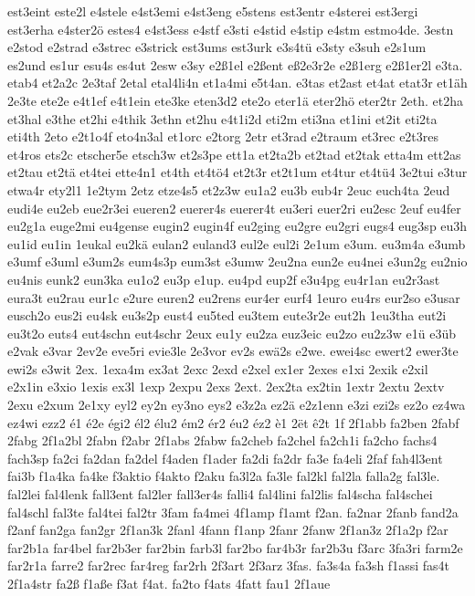 {est3eint
este2l
e4stele
e4st3emi
e4st3eng
e5stens
est3entr
e4sterei
est3ergi
est3erha
e4ster2ö
estes4
e4st3ess
e4stf
e3sti
e4stid
e4stip
e4stm
estmo4de.
3estn
e2stod
e2strad
e3strec
e3strick
est3ums
est3urk
e3s4tü
e3sty
e3suh
e2s1um
es2und
es1ur
esu4s
es4ut
2esw
e3sy
e2ß1el
e2ßent
eß2e3r2e
e2ß1erg
e2ß1er2l
e3ta.
etab4
et2a2c
2e3taf
2etal
etal4li4n
et1a4mi
e5t4an.
e3tas
et2ast
et4at
etat3r
et1äh
2e3te
ete2e
e4t1ef
e4t1ein
ete3ke
eten3d2
ete2o
eter1ä
eter2hö
eter2tr
2eth.
et2ha
et3hal
e3the
et2hi
e4thik
3ethn
et2hu
e4t1i2d
eti2m
eti3na
et1ini
et2it
eti2ta
eti4th
2eto
e2t1o4f
eto4n3al
et1orc
e2torg
2etr
et3rad
e2traum
et3rec
e2t3res
et4ros
ets2c
etscher5e
etsch3w
et2s3pe
ett1a
et2ta2b
et2tad
et2tak
etta4m
ett2as
et2tau
et2tä
et4tei
ette4n1
et4th
et4tö4
et2t3r
et2t1um
et4tur
et4tü4
3e2tui
e3tur
etwa4r
ety2l1
1e2tym
2etz
etze4s5
et2z3w
eu1a2
eu3b
eub4r
2euc
euch4ta
2eud
eudi4e
eu2eb
eue2r3ei
eueren2
euerer4s
euerer4t
eu3eri
euer2ri
eu2esc
2euf
eu4fer
eu2g1a
euge2mi
eu4gense
eugin2
eugin4f
eu2ging
eu2gre
eu2gri
eugs4
eug3sp
eu3h
eu1id
eu1in
1eukal
eu2kä
eulan2
euland3
eul2e
eul2i
2e1um
e3um.
eu3m4a
e3umb
e3umf
e3uml
e3um2s
eum4s3p
eum3st
e3umw
2eu2na
eun2e
eu4nei
e3un2g
eu2nio
eu4nis
eunk2
eun3ka
eu1o2
eu3p
e1up.
eu4pd
eup2f
e3u4pg
eu4r1an
eu2r3ast
eura3t
eu2rau
eur1c
e2ure
euren2
eu2rens
eur4er
eurf4
1euro
eu4rs
eur2so
e3usar
eusch2o
eus2i
eu4sk
eu3s2p
eust4
eu5ted
eu3tem
eute3r2e
eut2h
1eu3tha
eut2i
eu3t2o
euts4
eut4schn
eut4schr
2eux
eu1y
eu2za
euz3eic
eu2zo
eu2z3w
e1ü
e3üb
e2vak
e3var
2ev2e
eve5ri
evie3le
2e3vor
ev2s
ewä2s
e2we.
ewei4sc
ewert2
ewer3te
ewi2s
e3wit
2ex.
1exa4m
ex3at
2exc
2exd
e2xel
ex1er
2exes
e1xi
2exik
e2xil
e2x1in
e3xio
1exis
ex3l
1exp
2expu
2exs
2ext.
2ex2ta
ex2tin
1extr
2extu
2extv
2exu
e2xum
2e1xy
eyl2
ey2n
ey3no
eys2
e3z2a
ez2ä
e2z1enn
e3zi
ezi2s
ez2o
ez4wa
ez4wi
ezz2
é1
é2e
égi2
él2
élu2
ém2
ér2
éu2
éz2
è1
2ët
ê2t
1f
2f1abb
fa2ben
2fabf
2fabg
2f1a2bl
2fabn
f2abr
2f1abs
2fabw
fa2cheb
fa2chel
fa2ch1i
fa2cho
fachs4
fach3sp
fa2ci
fa2dan
fa2del
f4aden
f1ader
fa2di
fa2dr
fa3e
fa4eli
2faf
fah4l3ent
fai3b
f1a4ka
fa4ke
f3aktio
f4akto
f2aku
fa3l2a
fa3le
fal2kl
fal2la
falla2g
fal3le.
fal2lei
fal4lenk
fall3ent
fal2ler
fall3er4s
falli4
fal4lini
fal2lis
fal4scha
fal4schei
fal4schl
fal3te
fal4tei
fal2tr
3fam
fa4mei
4f1amp
f1amt
f2an.
fa2nar
2fanb
fand2a
f2anf
fan2ga
fan2gr
2f1an3k
2fanl
4fann
f1anp
2fanr
2fanw
2f1an3z
2f1a2p
f2ar
far2b1a
far4bel
far2b3er
far2bin
farb3l
far2bo
far4b3r
far2b3u
f3arc
3fa3ri
farm2e
far2r1a
farre2
far2rec
far4reg
far2rh
2f3art
2f3arz
3fas.
fa3s4a
fa3sh
f1assi
fas4t
2f1a4str
fa2ß
f1aße
f3at
f4at.
fa2to
f4ats
4fatt
fau1
2f1aue
}
